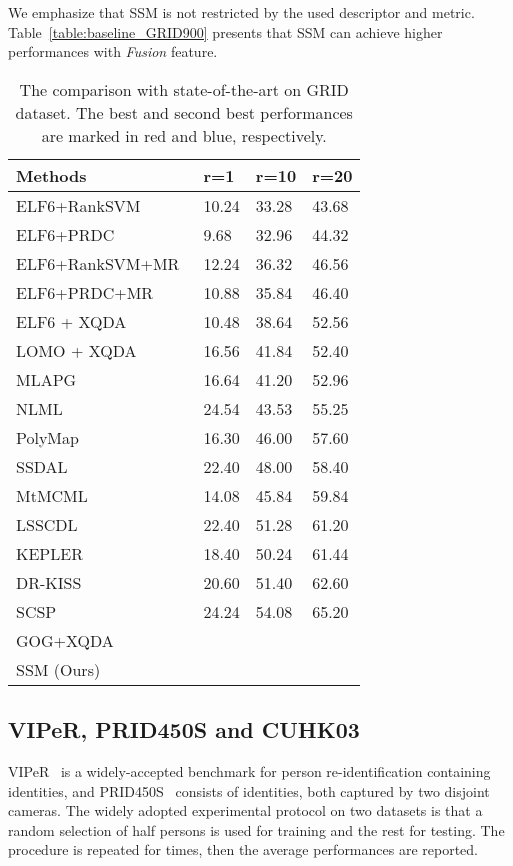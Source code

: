 \documentclass[10pt,twocolumn,letterpaper]{article}
\begin{document}
We emphasize that SSM is not restricted by the used descriptor and metric. Table~\ref{table:baseline_GRID900} presents that SSM can achieve higher performances with \emph{Fusion} feature.
\begin{table}[tb]
\small
\centering
\begin{tabular}{|l|*{3}{p{1cm}<{\centering}}|}
\hline
Methods          & r=1 & r=10 & r=20      \\
\hline
\hline
ELF6+RankSVM~\cite{RankSVM}    & 10.24 & 33.28 & 43.68 \\
ELF6+PRDC~\cite{PRDC} & 9.68 & 32.96 & 44.32 \\
ELF6+RankSVM+MR~\cite{person_manifold_ranking} & 12.24 & 36.32 & 46.56 \\
ELF6+PRDC+MR~\cite{person_manifold_ranking} & 10.88 & 35.84 & 46.40 \\
ELF6 + XQDA~\cite{XQDA}  & 10.48 & 38.64 & 52.56 \\
LOMO + XQDA~\cite{XQDA}      & 16.56 &  41.84 &  52.40 \\
MLAPG~\cite{MLAPG} & 16.64 & 41.20 & 52.96 \\
NLML~\cite{NLML} & 24.54 & 43.53 & 55.25 \\
PolyMap~\cite{PolyMap}   & 16.30	 &	46.00	 & 	57.60 \\
SSDAL~\cite{SuChi2} & 22.40	& 48.00 &	58.40 \\
MtMCML~\cite{MtMCML} & 14.08	& 45.84	& 59.84 \\
LSSCDL~\cite{LSSCDL} & 22.40 & 51.28  & 61.20 \\
KEPLER~\cite{KEPLER} & 18.40	& 50.24	& 61.44 \\
DR-KISS~\cite{DR-KISS}	 & 20.60 & 51.40 & 62.60 \\
SCSP~\cite{SCSP} & 24.24	&	54.08	&	65.20 \\
GOG+XQDA~\cite{GOG} & \textbf{\color{blue}{24.80}} & \textbf{\color{blue}{58.40}} & \textbf{\color{blue}{68.88}} \\
\hline
\hline
SSM (Ours) & \textbf{\color{red}{27.20}} & \textbf{\color{red}{61.12}} & \textbf{\color{red}{70.56}} \\
\hline
\end{tabular}
\caption{The comparison with state-of-the-art on GRID dataset. The best and second best performances are marked in red and blue, respectively.}
\label{table:art_GRID900}
\vspace{-2ex}
\end{table}

\subsection{VIPeR, PRID450S and CUHK03}
VIPeR~\cite{VIPeR_ELF} is a widely-accepted benchmark for person re-identification containing  identities, and PRID450S~\cite{PRID450S} consists of  identities, both captured by two disjoint cameras. The widely adopted experimental protocol on two datasets is that a random selection of half persons is used for training and the rest for testing. The procedure is repeated for  times, then the average performances are reported.
\end{document}
